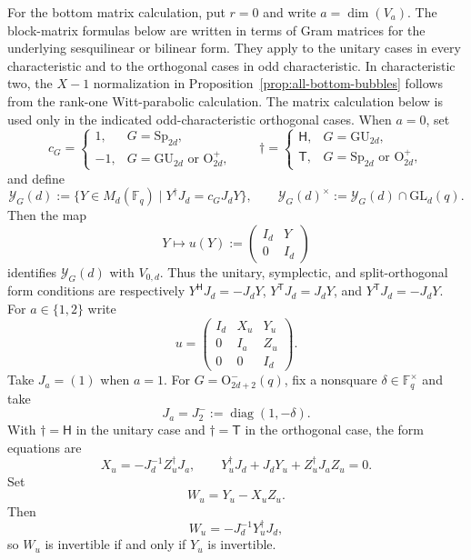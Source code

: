 \documentclass[12pt]{amsart}
\numberwithin{itemcounter}{subsection}
\theoremstyle{plain}
\theoremstyle{definition}
\theoremstyle{remark}
\numberwithin{equation}{section}
\def\bbF{\mathbb{F}}
\def\O{\mathrm{O}}
\def\Sp{\mathrm{Sp}}
\def\GL{\mathrm{GL}}
\def\GU{\mathrm{GU}}
\def\diag{\operatorname{diag}\nolimits}
\begin{document}
\medskip
\noindent
For the bottom matrix calculation, put $r=0$ and write $a=\dim(V_a)$.  The block-matrix formulas below
are written in terms of Gram matrices for the underlying sesquilinear or
bilinear form.  They apply to the unitary cases in every characteristic and
to the orthogonal cases in odd characteristic.  In characteristic two, the
$X-1$ normalization in Proposition~\ref{prop:all-bottom-bubbles} follows from
the rank-one Witt-parabolic calculation.  The matrix calculation below is
used only in the indicated odd-characteristic orthogonal cases.
  When $a=0$, set
\[
c_G=\begin{cases}
1,&G=\Sp_{2d},\\
-1,&G=\GU_{2d}\text{ or }\O^+_{2d},
\end{cases}
\qquad
\dagger=\begin{cases}
\mathsf H,&G=\GU_{2d},\\
\mathsf T,&G=\Sp_{2d}\text{ or }\O^+_{2d},
\end{cases}
\]
and define
\begin{equation}\label{eq:Y-G-space}
\mathscr Y_G(d):=
\{Y\in M_d(\bbF_q)\mid Y^\dagger J_d=c_GJ_dY\},
\qquad
\mathscr Y_G(d)^\times:=\mathscr Y_G(d)\cap\GL_d(q).
\end{equation}
Then the map
\[
Y\longmapsto u(Y):=\begin{pmatrix}I_d&Y\\0&I_d\end{pmatrix}
\]
identifies $\mathscr Y_G(d)$ with $V_{0,d}$.  Thus the unitary,
symplectic, and split-orthogonal form conditions are respectively
$Y^\mathsf HJ_d=-J_dY$, $Y^\mathsf TJ_d=J_dY$, and
$Y^\mathsf TJ_d=-J_dY$.
For $a\in\{1,2\}$ write
\[
u=\begin{pmatrix}
I_d&X_u&Y_u\\
0&I_a&Z_u\\
0&0&I_d
\end{pmatrix}.
\]
Take $J_a=(1)$ when $a=1$.  For $G=\O^-_{2d+2}(q)$, fix a
nonsquare $\delta\in\bbF_q^\times$ and take
\[
J_a=J_2^-:=\diag(1,-\delta).
\]
With $\dagger=\mathsf{H}$ in the unitary case and
$\dagger=\mathsf{T}$ in the orthogonal case, the form equations are
\begin{equation}\label{eq:bottom-form-eqs}
X_u=-J_d^{-1}Z_u^\dagger J_a,
\qquad
Y_u^\dagger J_d+J_dY_u+Z_u^\dagger J_aZ_u=0.
\end{equation}
Set
\[
W_u=Y_u-X_uZ_u.
\]
Then
\begin{equation}\label{eq:W-adjoint}
W_u=-J_d^{-1}Y_u^\dagger J_d,
\end{equation}
so $W_u$ is invertible if and only if $Y_u$ is invertible.
\end{document}
